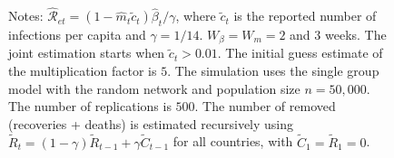 \documentclass[12pt]{article}
\begin{document}
\begin{figure}[tp]
\begin{footnotesize}
\begin{center}
\begin{tabular}
{\includegraphics[
height=1.9951in,
width=2.6524in
]%
{figs/Italy_ER_N50000_guess5_cmp_window_Re.png}%
}
\\
&  & \\
Spain &  & UK\\%
{\includegraphics[
height=1.9951in,
width=2.6524in
]%
{figs/Spain_ER_N50000_guess5_cmp_window_Re.png}%
}
&  &
{\includegraphics[
height=1.9951in,
width=2.6524in
]%
{figs/UK_ER_N50000_guess5_cmp_window_Re.png}%
}
\end{tabular}



\end{center}

%

\vspace{-0.1cm}%
Notes: $\mathcal{\hat{R}}_{et}=\left(  1-\hat{m}_{t}\tilde{c}_{t}\right)
\hat{\beta}_{t}/\gamma$, where $\tilde{c}_{t}$ is the reported number of
infections per capita and $\gamma=1/14$. $W_{\beta}=W_{m}=2$ and $3$ weeks.
The joint estimation starts when $\tilde{c}_{t}>0.01$. The initial guess
estimate of the multiplication factor is $5$. The simulation uses the single
group model with the random network and population size $n=50,000$. The number
of replications is $500$. The number of removed (recoveries + deaths) is
estimated recursively using $\tilde{R}_{t}=\left(  1-\gamma\right)  \tilde
{R}_{t-1}+\gamma\tilde{C}_{t-1}$ for all countries, with $\tilde{C}_{1}%
=\tilde{R}_{1}=0$.%


\end{footnotesize}
\end{figure}
\end{document}
